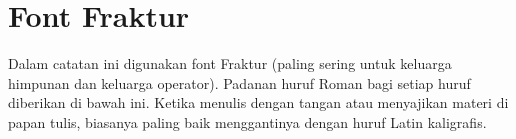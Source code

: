 \vfill\eject







\section*{Font Fraktur}

Dalam catatan ini digunakan font Fraktur (paling sering untuk keluarga himpunan dan
keluarga operator). Padanan huruf Roman bagi setiap huruf diberikan di bawah ini. Ketika
menulis dengan tangan atau menyajikan materi di papan tulis, biasanya paling baik
menggantinya dengan huruf Latin kaligrafis.

